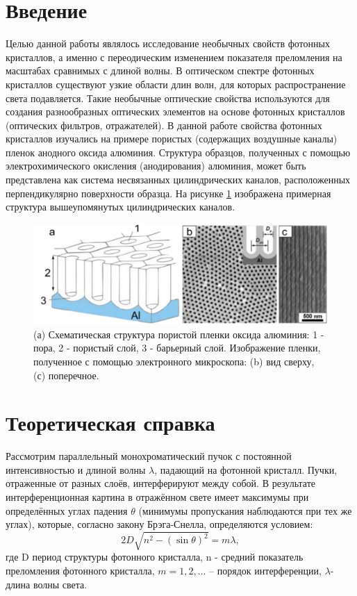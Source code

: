 \documentclass[a4paper, 12pt]{article}
\begin{document}
	\section*{Введение}
	Целью данной работы являлось исследование необычных свойств фотонных кристаллов, а именно с переодическим изменением показателя преломления на масштабах сравнимых с длиной волны. В оптическом спектре фотонных кристаллов существуют узкие области длин волн, для которых распространение света подавляется. Такие необычные оптические свойства используются для создания разнообразных оптических элементов на основе фотонных кристаллов (оптических фильтров, отражателей).
	В данной работе свойства фотонных кристаллов изучались на примере пористых (содержащих воздушные каналы) пленок анодного оксида алюминия. Структура образцов, полученных с помощью электрохимического окисления (анодирования) алюминия, может быть представлена как система несвязанных цилиндрических каналов, расположенных перпендикулярно поверхности образца. На рисунке \ref{fig:1} изображена примерная структура вышеупомянутых цилиндрических каналов.
	\begin{figure}[H]
		\centering
		\includegraphics[width=1\linewidth]{Struct.png}
		\caption{(а) Схематическая структура пористой пленки оксида алюминия: 1 - пора, 2 - пористый слой, 3 - барьерный слой. Изображение пленки, полученное с помощью электронного микроскопа: (b) вид сверху, (с) поперечное.}
		\label{fig:1}
	\end{figure}
	\section*{Теоретическая справка}
	Рассмотрим параллельный монохроматический пучок с постоянной интенсивностью и длиной волны $\lambda$, падающий на фотонной кристалл. Пучки, отраженные от разных слоёв, интерферируют между собой. В результате интерференционная картина в отражённом свете имеет максимумы при определённых углах падения $\theta$ (минимумы пропускания наблюдаются при тех же углах), которые, согласно закону Брэга-Снелла, определяются условием:
	\begin{equation}
	2D\sqrt{n^{2}-(\sin{\theta})^{2}}  =  m\lambda,
	\end{equation}
	где D период структуры фотонного кристалла, n - средний показатель преломления фотонного кристалла, $m= 1,2, ...$ – порядок интерференции, $\lambda$- длина волны света.
	
\end{document}

